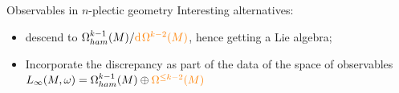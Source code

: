 \documentclass[handout,10pt]{beamer}
\begin{document}
\begin{frame}{Observables in $n$-plectic geometry}
    \vfill
    \pause
    Interesting alternatives:
        \begin{itemize}
          \item  descend to $\Omega^{k-1}_{ham}(M) / {\color{orange}\mathrm{d}\hspace{1pt}\Omega^{k-2}(M)}$, hence getting a Lie algebra;
          \item Incorporate the {\color{orange}discrepancy} as part of the data of the space of observables $
          L_\infty(M,\omega) = \Omega_{ham}^{k-1}(M)\oplus{\color{orange}\Omega^{\leq k-2}(M)}$
        \end{itemize}
    
      \end{frame}
    \note[itemize]{
    \item
    }
    
\end{document}
